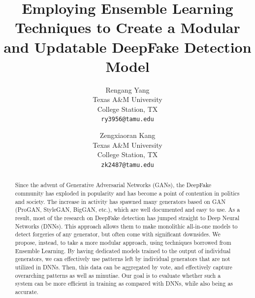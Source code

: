 \documentclass[11pt,twocolumn,letterpaper]{article}
\begin{document}
\title{Employing Ensemble Learning Techniques to Create a Modular and Updatable DeepFake Detection Model}

\author{Rengang Yang\\
Texas A\&M University\\
College Station, TX\\
{\tt\small ry3956@tamu.edu}
\and
Zengxiaoran Kang\\
Texas A\&M University\\
College Station, TX\\
{\tt\small zk2487@tamu.edu}
}
\maketitle

\begin{abstract}
Since the advent of Generative Adversarial Networks (GANs), the DeepFake community has exploded in popularity and has become a point of contention in politics and society. The increase in activity has spawned many generators based on GAN (ProGAN, StyleGAN, BigGAN, etc.), which are well documented and easy to use. As a result, most of the research on DeepFake detection has jumped straight to Deep Neural Networks (DNNs). This approach allows them to make monolithic all-in-one models to detect forgeries of any generator, but often come with significant downsides. We propose, instead, to take a more modular approach, using techniques borrowed from Ensemble Learning. By having dedicated models trained to the output of individual generators, we can effectively use patterns left by individual generators that are not utilized in DNNs. Then, this data can be aggregated by vote, and effectively capture overarching patterns as well as minutiae. Our goal is to evaluate whether such a system can be more efficient in training as compared with DNNs, while also being as accurate. 
\end{abstract}

\end{document}
